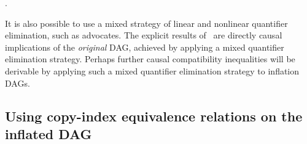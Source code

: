 {{%
}.

It is also possible to use a mixed strategy of linear and nonlinear quantifier elimination, such as \citet{ChavesPolynomial} advocates. The explicit results of~\cite{ChavesPolynomial} are directly causal implications of the \emph{original} DAG, achieved by applying a mixed quantifier elimination strategy. Perhaps further causal compatibility inequalities will be derivable by applying such a mixed quantifier elimination strategy to inflation DAGs.

\subsection{Using copy-index equivalence relations on the inflated DAG}\label{Sec:copyindexequivalence}

}
